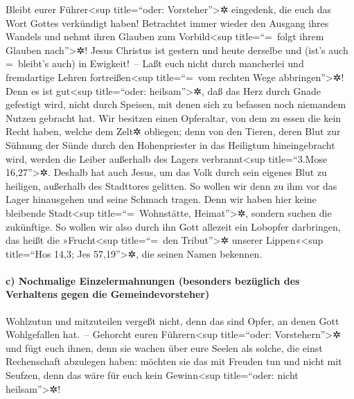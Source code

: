  Bleibt eurer Führer\textless sup title=``oder:
Vorsteher''\textgreater✲ eingedenk, die euch das Wort Gottes verkündigt
haben! Betrachtet immer wieder den Ausgang ihres Wandels und nehmt ihren
Glauben zum Vorbild\textless sup title=``=~folgt ihrem Glauben
nach''\textgreater✲!  Jesus Christus ist gestern und heute
derselbe und (ist's auch =~bleibt's auch) in Ewigkeit!~-- 
Laßt euch nicht durch mancherlei und fremdartige Lehren
fortreißen\textless sup title=``=~vom rechten Wege
abbringen''\textgreater✲! Denn es ist gut\textless sup title=``oder:
heilsam''\textgreater✲, daß das Herz durch Gnade gefestigt wird, nicht
durch Speisen, mit denen sich zu befassen noch niemandem Nutzen gebracht
hat.  Wir besitzen einen Opferaltar, von dem zu essen die
kein Recht haben, welche dem Zelt✲ obliegen;  denn von
den Tieren, deren Blut zur Sühnung der Sünde durch den Hohenpriester in
das Heiligtum hineingebracht wird, werden die Leiber außerhalb des
Lagers verbrannt\textless sup title=``3.Mose 16,27''\textgreater✲.
 Deshalb hat auch Jesus, um das Volk durch sein eigenes
Blut zu heiligen, außerhalb des Stadttores gelitten.  So
wollen wir denn zu ihm vor das Lager hinausgehen und seine Schmach
tragen.  Denn wir haben hier keine bleibende
Stadt\textless sup title=``=~Wohnstätte, Heimat''\textgreater✲, sondern
suchen die zukünftige.  So wollen wir also durch ihn Gott
allezeit ein Lobopfer darbringen, das heißt die »Frucht\textless sup
title=``=~den Tribut''\textgreater✲ unserer Lippen«\textless sup
title=``Hos 14,3; Jes 57,19''\textgreater✲, die seinen Namen bekennen.

\hypertarget{c-nochmalige-einzelermahnungen-besonders-bezuxfcglich-des-verhaltens-gegen-die-gemeindevorsteher}{%
\paragraph{c) Nochmalige Einzelermahnungen (besonders bezüglich des
Verhaltens gegen die
Gemeindevorsteher)}\label{c-nochmalige-einzelermahnungen-besonders-bezuxfcglich-des-verhaltens-gegen-die-gemeindevorsteher}}

 Wohlzutun und mitzuteilen vergeßt nicht, denn das sind
Opfer, an denen Gott Wohlgefallen hat.~--  Gehorcht euren
Führern\textless sup title=``oder: Vorstehern''\textgreater✲ und fügt
euch ihnen, denn sie wachen über eure Seelen als solche, die einst
Rechenschaft abzulegen haben: möchten sie das mit Freuden tun und nicht
mit Seufzen, denn das wäre für euch kein Gewinn\textless sup
title=``oder: nicht heilsam''\textgreater✲!

